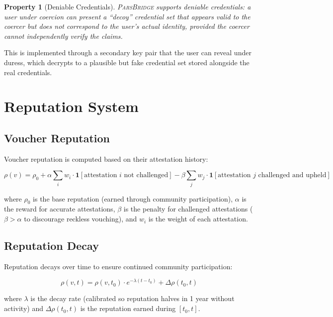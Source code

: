 \documentclass[11pt,a4paper]{article}
\newcommand{\bridge}{\textsc{ParsBridge}\xspace}
\newtheorem{property}{Property}
\begin{document}
\begin{property}[Deniable Credentials]
\bridge supports deniable credentials: a user under coercion can present a ``decoy'' credential set that appears valid to the coercer but does not correspond to the user's actual identity, provided the coercer cannot independently verify the claims.
\end{property}

This is implemented through a secondary key pair that the user can reveal under duress, which decrypts to a plausible but fake credential set stored alongside the real credentials.

\section{Reputation System}

\subsection{Voucher Reputation}

Voucher reputation is computed based on their attestation history:

\begin{equation}
    \rho(v) = \rho_0 + \alpha \sum_{i} w_i \cdot \mathbf{1}[\text{attestation } i \text{ not challenged}] - \beta \sum_{j} w_j \cdot \mathbf{1}[\text{attestation } j \text{ challenged and upheld}]
\end{equation}

where $\rho_0$ is the base reputation (earned through community participation), $\alpha$ is the reward for accurate attestations, $\beta$ is the penalty for challenged attestations ($\beta > \alpha$ to discourage reckless vouching), and $w_i$ is the weight of each attestation.

\subsection{Reputation Decay}

Reputation decays over time to ensure continued community participation:

\begin{equation}
    \rho(v, t) = \rho(v, t_0) \cdot e^{-\lambda(t - t_0)} + \Delta\rho(t_0, t)
\end{equation}

where $\lambda$ is the decay rate (calibrated so reputation halves in 1 year without activity) and $\Delta\rho(t_0, t)$ is the reputation earned during $[t_0, t]$.
\end{document}
